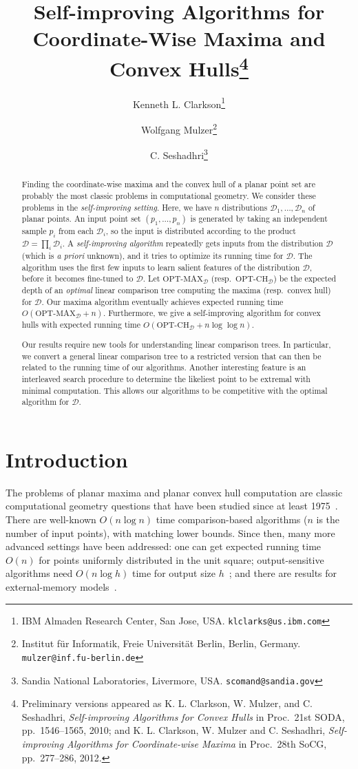 \documentclass[letterpaper,11pt]{article}
\title{
  Self-improving Algorithms for Coordinate-Wise Maxima and Convex 
  Hulls\footnote{Preliminary versions appeared as
  K. L. Clarkson, W. Mulzer, and C. Seshadhri,
  \emph{Self-improving Algorithms for Convex Hulls} in Proc.~21st SODA, 
  pp.~1546--1565, 2010;
  and K. L. Clarkson, W. Mulzer and C. Seshadhri, 
  \emph{Self-improving Algorithms for
  Coordinate-wise Maxima} in Proc.~28th SoCG, pp.~277--286, 2012.
  }
}
\author{
  Kenneth L. Clarkson\footnote{IBM Almaden Research Center, San Jose, USA.
    \texttt{klclarks@us.ibm.com}
  }
  \and
  Wolfgang Mulzer\footnote{Institut f\"ur Informatik, Freie Universit\"at 
    Berlin, Berlin, Germany.
    \texttt{mulzer@inf.fu-berlin.de} 
  }
  \and
  C. Seshadhri\footnote{Sandia National Laboratories, Livermore, USA.
    \texttt{scomand@sandia.gov}
}
}
\newcommand{\OPTMAX}{\text{OPT-MAX}}
\newcommand{\OPTCH}{\text{OPT-CH}}
\newcommand{\cD}{\mathcal{D}}
\begin{document}
 

\maketitle

\begin{abstract}
  Finding the coordinate-wise maxima and the convex 
  hull of a planar point set are probably the most 
  classic problems in computational geometry.  We 
  consider these problems in the \emph{self-improving setting}. 
  Here, we have $n$ distributions $\cD_1, \ldots, \cD_n$ 
  of planar points. An input point set $(p_1, \ldots, p_n)$ 
  is generated by taking an independent sample $p_i$ 
  from each $\cD_i$, so the input is distributed 
  according to the product $\cD = \prod_i \cD_i$. 
  A \emph{self-improving algorithm} repeatedly gets inputs 
  from the distribution $\cD$ (which is \emph{a priori} 
  unknown), and it tries to optimize its running time 
  for $\cD$. The algorithm uses the first few inputs to 
  learn salient features of the distribution $\cD$, before 
  it becomes fine-tuned to $\cD$. Let $\OPTMAX_\cD$ 
  (resp.~$\OPTCH_\cD$) be the expected depth 
  of an \emph{optimal} linear comparison tree computing 
  the maxima (resp.~convex hull) for $\cD$. 
  Our maxima algorithm eventually achieves expected 
  running time $O(\OPTMAX_\cD + n)$. 
  Furthermore, we give a self-improving algorithm for convex hulls
  with expected running time $O(\OPTCH_\cD + n\log\log n)$.

  Our results require new tools for understanding linear 
  comparison trees. In particular, we convert 
  a general linear comparison tree to a restricted 
  version that can then be related to the running time 
  of our algorithms. Another interesting feature 
  is an interleaved search procedure 
  to determine the likeliest point to be extremal 
  with minimal computation. This allows our algorithms
  to be competitive with the optimal algorithm for 
  $\cD$.
\end{abstract}

\section{Introduction}
\label{sec:intro}

The problems of planar maxima and planar convex hull 
computation are classic computational geometry questions 
that have been studied since at least 1975~\cite{KungLuPr75}. 
There are well-known $O(n \log n)$ time comparison-based 
algorithms ($n$ is the number of input points), with 
matching lower bounds. Since then,
many more advanced settings have been addressed: one can 
get expected running time $O(n)$ for points uniformly 
distributed in the unit square; 
output-sensitive algorithms need $O(n\log h)$ time
for output size $h$~\cite{KirkpatrickSe86}; 
and there are results for external-memory 
models~\cite{GoodrichTsVeVi93}. 
\end{document}
